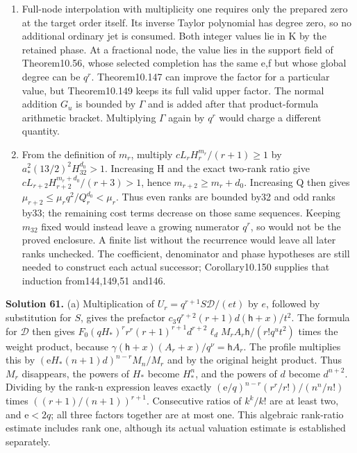 \documentclass[
  11pt,
  a4paper,
]{article}
\begin{document}
\begin{enumerate}
\def\labelenumi{(\alph{enumi})}
\setcounter{enumi}{1}
\item
  Full-node interpolation with multiplicity one requires only the
  prepared zero at the target order itself. Its inverse Taylor
  polynomial has degree zero, so no additional ordinary jet is consumed.
  Both integer values lie in K by the retained phase. At a fractional
  node, the value lies in the support field of Theorem10.56, whose
  selected completion has the same e,f but whose global degree can be
  \(q^r\). Theorem10.147 can improve the factor for a particular value,
  but Theorem10.149 keeps its full valid upper factor. The normal
  addition \(G_u\) is bounded by \(\Gamma\) and is added after that
  product-formula arithmetic bracket. Multiplying \(\Gamma\) again by
  \(q^r\) would charge a different quantity.
\item
  From the definition of \(m_r\), multiply \(cL_rH_r^{m_r}/(r+1)\ge1\)
  by \(a_*^2(13/2)^2H_{32}^{d_0}>1\). Increasing H and the exact
  two-rank ratio give \(cL_{r+2}H_{r+2}^{m_r+d_0}/(r+3)>1\), hence
  \(m_{r+2}\ge m_r+d_0\). Increasing Q then gives
  \(\mu_{r+2}\le\mu_rq^2/Q_r^{d_0}<\mu_r\). Thus even ranks are bounded
  by32 and odd ranks by33; the remaining cost terms decrease on those
  same sequences. Keeping \(m_{32}\) fixed would instead leave a growing
  numerator \(q^r\), so would not be the proved enclosure. A finite list
  without the recurrence would leave all later ranks unchecked. The
  coefficient, denominator and phase hypotheses are still needed to
  construct each actual successor; Corollary10.150 supplies that
  induction from144,149,51 and146.
\end{enumerate}

\textbf{Solution 61.} (a) Multiplication of
\(U_r=q^{r+1}S\mathcal D/(et)\) by \(e\), followed by substitution for
\(S\), gives the prefactor \(c_3q^{r+2}(r+1)d(\mathsf h+x)/t^2\). The
formula for \(\mathcal D\) then gives
\(F_0(qH_*)^r r^r(r+1)^{r+1}d^{r+2}\ell_d M_r A_r\mathsf h/(r!q^ut^2)\)
times the weight product, because
\(\gamma(\mathsf h+x)(A_r+x)/q^\nu=\mathsf hA_r\). The profile
multiplies this by \((\mathrm eH_*(n+1)d)^{n-r}M_n/M_r\) and by the
original height product. Thus \(M_r\) disappears, the powers of \(H_*\)
become \(H_*^n\), and the powers of \(d\) become \(d^{n+2}\). Dividing
by the rank-n expression leaves exactly
\((\mathrm e/q)^{n-r}(r^r/r!)/(n^n/n!)\) times \(((r+1)/(n+1))^{r+1}\).
Consecutive ratios of \(k^k/k!\) are at least two, and \(\mathrm e<2q\);
all three factors together are at most one. This algebraic rank-ratio
estimate includes rank one, although its actual valuation estimate is
established separately.
\end{document}
